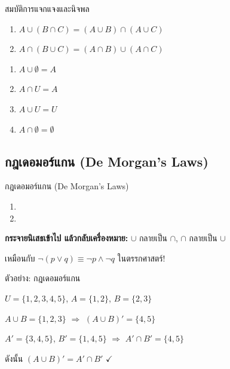 \documentclass[11pt, aspectratio=169]{beamer}
\begin{document}
\begin{frame}{สมบัติการแจกแจงและนิจพล}
  \begin{explanation}
    \begin{enumerate}
      \item $A \cup (B \cap C) = (A \cup B) \cap (A \cup C)$
      \item $A \cap (B \cup C) = (A \cap B) \cup (A \cap C)$
    \end{enumerate}
  \end{explanation}

  \begin{explanation}
    \begin{enumerate}
      \item $A \cup \emptyset = A$
      \item $A \cap U = A$
      \item $A \cup U = U$
      \item $A \cap \emptyset = \emptyset$
    \end{enumerate}
  \end{explanation}
\end{frame}

\subsection{กฎเดอมอร์แกน (De Morgan's Laws)}

\begin{frame}{กฎเดอมอร์แกน (De Morgan's Laws)}
  \begin{explanation}
    \begin{enumerate}
      \item {}
      \item {}
    \end{enumerate}
  \end{explanation}

  \begin{intuition}[วิธีจำ]
    \textbf{กระจายนิเสธเข้าไป แล้วกลับเครื่องหมาย:}
    $\cup$ กลายเป็น $\cap$, \quad $\cap$ กลายเป็น $\cup$

    เหมือนกับ $\lnot(p \lor q) \equiv \lnot p \land \lnot q$ ในตรรกศาสตร์!
  \end{intuition}
\end{frame}

\begin{frame}{ตัวอย่าง: กฎเดอมอร์แกน}
  \begin{exambox}[ตรวจสอบ]
    $U = \{1, 2, 3, 4, 5\}$, \quad $A = \{1, 2\}$, \quad $B = \{2, 3\}$

    \medskip
    $A \cup B = \{1, 2, 3\}$ \quad $\Rightarrow$ \quad $(A \cup B)' = \{4, 5\}$

    $A' = \{3, 4, 5\}$, \; $B' = \{1, 4, 5\}$ \quad $\Rightarrow$ \quad $A' \cap B' = \{4, 5\}$

    \medskip
    ดังนั้น $(A \cup B)' = A' \cap B'$ \quad $\checkmark$
  \end{exambox}
\end{frame}
\end{document}
